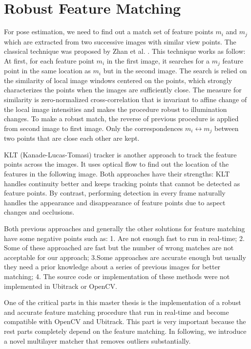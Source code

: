\chapter{Robust Feature Matching}\label{chapter:Robust Feature Matching}
For pose estimation, we need to find out a match set of feature points ${m_i}$ and ${m_j}$ which are extracted from two successive images with similar view points. The classical technique was proposed by Zhan et al. \cite{zhang1995robust}. This technique works as follow: At first, for each feature point ${m_i}$ in the first image, it searches for a ${m_j}$ feature point in the same location as ${m_i}$ but in the second image. The search is relied on the similarity of local image windows centered on the points, which strongly characterizes the points when the images are sufficiently close. The measure for similarity is zero-normalized cross-correlation that is invariant to affine change of the local image intensities and makes the procedure robust to illumination changes. To make a robust match, the reverse of previous procedure is applied from second image to first image. Only the correspondences ${m_i} \longleftrightarrow {m_j}$ between two points that are close each other are kept.

KLT (Kanade-Lucas-Tomasi) tracker \cite{tomasi1991detection} \cite{shi1994good} is another approach to track the feature points across the images. It uses optical flow to find out the location of the features in the following image. Both approaches have their strengths: KLT handles continuity better and keeps tracking points that cannot be detected as feature points. By contrast, performing detection in every frame naturally handles the appearance and disappearance of feature points due to aspect changes and occlusions.

Both previous approaches and generally the other solutions for feature matching have some negative points such as: 1. Are not enough fast to run in real-time; 2. Some of these approached are fast but the number of wrong matches are not acceptable for our approach; 3.Some approaches are accurate enough but usually they need a prior knowledge about a series of previous images for better matching; 4. The source code or implementation of these methods were not implemented in Ubitrack or OpenCV. 

One of the critical parts in this master thesis is the implementation of a robust and accurate feature matching procedure that run in real-time and become compatible with OpenCV and Ubitrack. This part is very important because the rest parts completely depend on the feature matching. In following, we introduce a novel multilayer matcher that removes outliers substantially.

